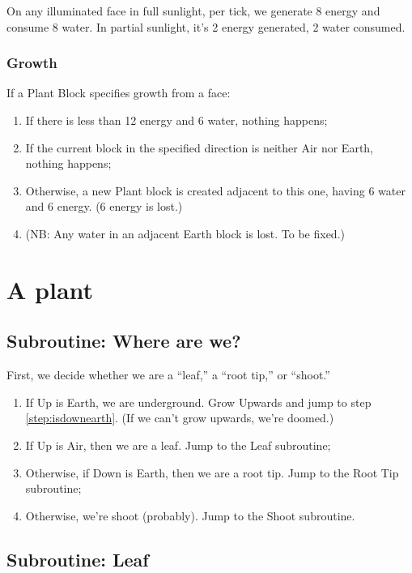 \documentclass[10pt, a4paper, twocolumn]{article}
\begin{document}
On any illuminated face in full sunlight, per tick, we generate 8
energy and consume 8 water. In partial sunlight, it's 2 energy
generated, 2 water consumed. 

\subsubsection{Growth}

If a Plant Block specifies growth from a face:
\begin{enumerate}
\item If there is less than 12 energy and 6 water, nothing happens;
\item If the current block in the specified direction is neither Air
  nor Earth, nothing happens;
\item Otherwise, a new Plant block is created adjacent to this one,
  having 6 water and 6 energy. (6 energy is lost.)
\item (NB: Any water in an adjacent Earth block is lost. To be fixed.)
\end{enumerate}


\section{A plant}

\subsection{Subroutine: Where are we?}

First, we decide whether we are a ``leaf,'' a ``root tip,'' or ``shoot.''
\begin{enumerate}
\item If Up is Earth, we are underground. Grow Upwards and jump to
  step \ref{step:isdownearth}. (If we can't grow upwards, we're
  doomed.)
\item If Up is Air, then we are a leaf. Jump to the Leaf
  subroutine;
\item Otherwise, if Down is Earth, then we are a root tip. Jump to the
  Root Tip subroutine;\label{step:isdownearth}
\item Otherwise, we're shoot (probably). Jump to the Shoot subroutine.
\end{enumerate}

\subsection{Subroutine: Leaf}
\end{document}
